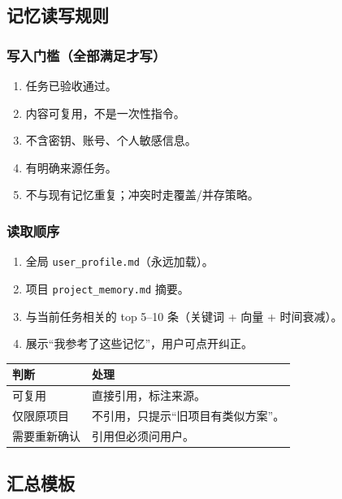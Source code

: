 \documentclass[UTF8,11pt,a4paper,fontset=windows]{ctexart}
\let\ocsubsection\subsection
\renewcommand{\subsection}{\Needspace{5\baselineskip}\ocsubsection}
\let\ocsubsubsection\subsubsection
\renewcommand{\subsubsection}{\Needspace{4\baselineskip}\ocsubsubsection}
\newcommand{\code}[1]{\texttt{#1}}
\begin{document}
\subsection{记忆读写规则}

\subsubsection*{写入门槛（全部满足才写）}

\begin{enumerate}
  \item 任务已验收通过。
  \item 内容可复用，不是一次性指令。
  \item 不含密钥、账号、个人敏感信息。
  \item 有明确来源任务。
  \item 不与现有记忆重复；冲突时走覆盖/并存策略。
\end{enumerate}

\subsubsection*{读取顺序}

\begin{enumerate}
  \item 全局 \code{user\_profile.md}（永远加载）。
  \item 项目 \code{project\_memory.md} 摘要。
  \item 与当前任务相关的 top 5--10 条（关键词 + 向量 + 时间衰减）。
  \item 展示“我参考了这些记忆”，用户可点开纠正。
\end{enumerate}

\noindent\begin{minipage}{\linewidth}
\centering
{}
\small
\begin{tabularx}{\linewidth}{@{}p{3.2cm} X@{}}
\toprule
\textbf{判断} & \textbf{处理} \\
\midrule
可复用 & 直接引用，标注来源。 \\
仅限原项目 & 不引用，只提示“旧项目有类似方案”。 \\
需要重新确认 & 引用但必须问用户。 \\
\bottomrule
\end{tabularx}
\end{minipage}

\subsection{汇总模板}
\end{document}
